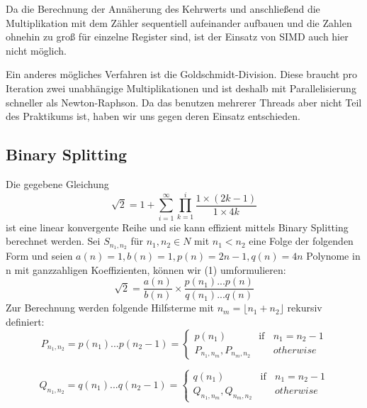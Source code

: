 \documentclass[course=erap]{aspdoc}
\begin{document}
	Da die Berechnung der Annäherung des Kehrwerts und anschließend die Multiplikation mit dem Zähler sequentiell aufeinander aufbauen und die Zahlen ohnehin zu groß für einzelne Register sind, ist der Einsatz von SIMD auch hier nicht möglich.\newline
	
	Ein anderes mögliches Verfahren ist die Goldschmidt-Division. Diese braucht pro Iteration zwei unabhängige Multiplikationen und ist deshalb mit Parallelisierung schneller als Newton-Raphson. Da das benutzen mehrerer Threads aber nicht Teil des Praktikums ist, haben wir uns gegen deren Einsatz entschieden.
	
	\subsection{Binary Splitting}
	Die gegebene Gleichung 
	\begin{equation}
		\sqrt{2} = 1 + \sum_{i=1}^{\infty} \prod_{k=1}^{i} \frac{1 \times (2k-1)}{1 \times 4k}
	\end{equation} 
	ist eine linear konvergente Reihe und sie kann effizient mittels Binary Splitting berechnet werden. Sei $S_{n_1, n_2}$ für $n_1, n_2 \in N$ mit $n_1 < n_2$ eine Folge der folgenden Form und seien $a(n) = 1, b(n) = 1, p(n) = 2n - 1, q(n) = 4n$ Polynome in n mit ganzzahligen Koeffizienten, können wir (1) umformulieren: 
	\begin{equation*}
		\sqrt{2} = \frac{a(n)}{b(n)} \times \frac{p(n_1) . . . p(n)}{q(n_1) . . . q(n)}
	\end{equation*} 
	Zur Berechnung werden folgende Hilfsterme mit $n_m = \lfloor n_1 + n_2 \rfloor$ rekursiv definiert:
	\begin{equation*}
		P_{n_1,n_2} = p(n_1) ... p(n_2 - 1) =  \left\{ \begin{array}{rcl}		
			p(n_1)  & \mbox{if} & n_1 = n_2 - 1  \\
			P_{n_1,n_m},P_{n_m,n_2}  & \mbox{ } &  otherwise			
		\end{array}\right.
	\end{equation*}
	
	\begin{equation*}
		Q_{n_1,n_2} = q(n_1) ... q(n_2 - 1) =  \left\{ \begin{array}{rcl}		
			q(n_1)  & \mbox{if} & n_1 = n_2 - 1  \\
			Q_{n_1,n_m},Q_{n_m,n_2}  & \mbox{ } &  otherwise			
		\end{array}\right.
	\end{equation*}	
	
\end{document}
